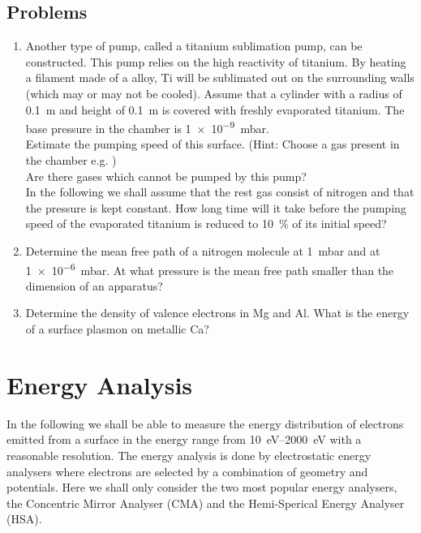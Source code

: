 \section{Problems}
\begin{enumerate}
\item Another type of pump, called a titanium sublimation pump, can be constructed. This pump relies on the high reactivity of titanium. By heating a filament made of a  alloy, Ti will be sublimated out on the surrounding walls (which may or may not be cooled). Assume that a cylinder with a radius of \SI{.1}{m} and height of \SI{.1}{m} is covered with freshly evaporated titanium. The base pressure in the chamber is \SI{1e-9}{mbar}.\\

Estimate the pumping speed of this surface. (Hint: Choose a gas present in the chamber e.g. )\\

Are there gases which cannot be pumped by this pump?\\

In the following we shall assume that the rest gas consist of nitrogen and that the pressure is kept constant. How long time will it take before the pumping speed of the evaporated titanium is reduced to \SI{10}{\percent} of its initial speed?\\

\item Determine the mean free path of a nitrogen molecule at \SI{1}{mbar} and at \SI{1e-6}{mbar}. At what pressure is the mean free path smaller than the dimension of an apparatus?

\item Determine the density of valence electrons in Mg and Al. What is the energy of a surface plasmon on metallic Ca?
\end{enumerate}

\chapter{Energy Analysis}
In the following we shall be able to measure the energy distribution of electrons emitted from a surface in the energy range from \SIrange{10}{2000}{\electronvolt} with a reasonable resolution. The energy analysis is done by electrostatic energy analysers where electrons are selected by a combination of geometry and potentials. Here we shall only consider the two most popular energy analysers, the Concentric Mirror Analyser (CMA) and the Hemi-Sperical Energy Analyser (HSA).

